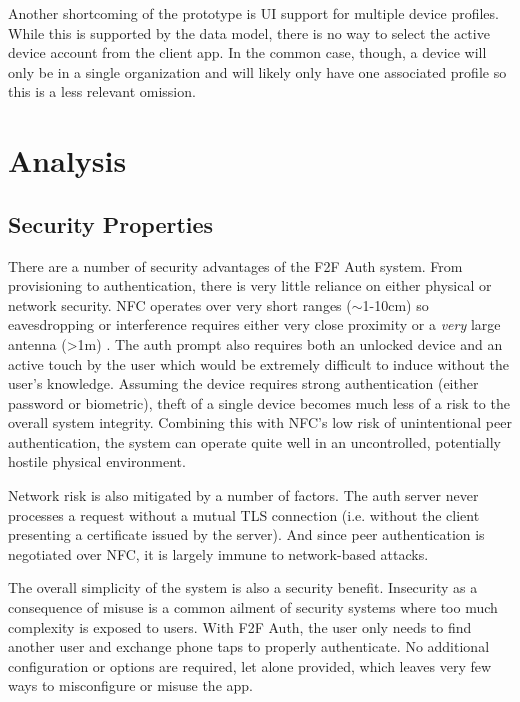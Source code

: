 \documentclass[letterpaper, 10 pt, conference]{ieeeconf}
\begin{document}
  Another shortcoming of the prototype is UI support for multiple device profiles.
  While this is supported by the data model, there is no way to select the active device account from the client app.
  In the common case, though, a device will only be in a single organization and will likely only have one associated profile so this is a less relevant omission.

\section{Analysis} \label{security}

\subsection{Security Properties} \label{secproperties}
  There are a number of security advantages of the F2F Auth system.
  From provisioning to authentication, there is very little reliance on either physical or network security.
  NFC operates over very short ranges ($\sim$1-10cm) so eavesdropping or interference requires either very close proximity or a \emph{very} large antenna (\textgreater1m) \cite{surrey}.
  The auth prompt also requires both an unlocked device and an active touch by the user which would be extremely difficult to induce without the user's knowledge.
  Assuming the device requires strong authentication (either password or biometric), theft of a single device becomes much less of a risk to the overall system integrity.
  Combining this with NFC's low risk of unintentional peer authentication, the system can operate quite well in an uncontrolled, potentially hostile physical environment.

  Network risk is also mitigated by a number of factors.
  The auth server never processes a request without a mutual TLS connection (i.e. without the client presenting a certificate issued by the server).
  And since peer authentication is negotiated over NFC, it is largely immune to network-based attacks.
    
  The overall simplicity of the system is also a security benefit.
  Insecurity as a consequence of misuse is a common ailment of security systems where too much complexity is exposed to users.
  With F2F Auth, the user only needs to find another user and exchange phone taps to properly authenticate.
  No additional configuration or options are required, let alone provided, which leaves very few ways to misconfigure or misuse the app.
\end{document}
